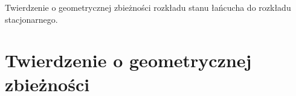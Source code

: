 {
\makeatletter
{}
\makeatother
\graphicspath{{../probabil}}

\begin{questiontext}
	Twierdzenie o geometrycznej zbieżności rozkładu stanu łańcucha do rozkładu stacjonarnego.
\end{questiontext}

\section{Twierdzenie o geometrycznej zbieżności}
 {
 }
}